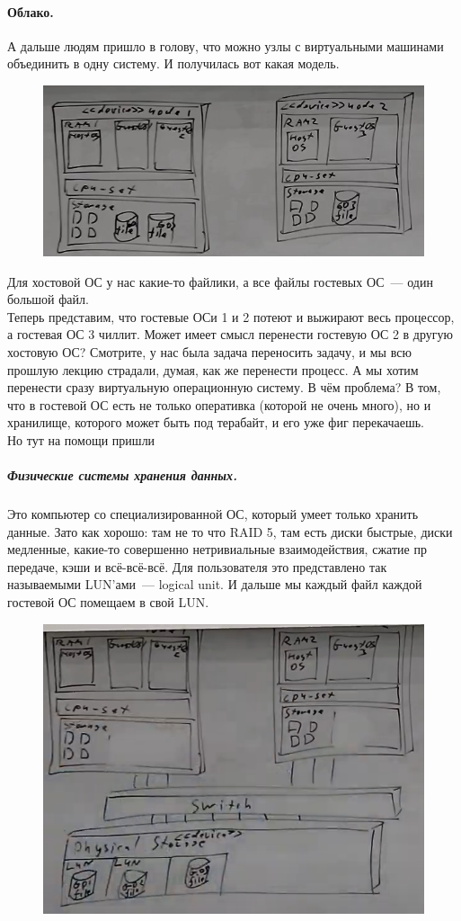 \documentclass{article}
\begin{document}
    \paragraph{Облако.}
    А дальше людям пришло в голову, что можно узлы с виртуальными машинами объединить в одну систему. И получилась вот какая модель.
    \begin{figure}[H]
        \centering
        \includegraphics[width=0.7\linewidth]{Images/screenshot004}
    \end{figure}\noindent
    Для хостовой ОС у нас какие-то файлики, а все файлы гостевых ОС~--- один большой файл.\\
    Теперь представим, что гостевые ОСи 1 и 2 потеют и выжирают весь процессор, а гостевая ОС 3 чиллит. Может имеет смысл перенести гостевую ОС 2 в другую хостовую ОС? Смотрите, у нас была задача переносить задачу, и мы всю прошлую лекцию страдали, думая, как же перенести процесс. А мы хотим перенести сразу виртуальную операционную систему. В чём проблема? В том, что в гостевой ОС есть не только оперативка (которой не очень много), но и хранилище, которого может быть под терабайт, и его уже фиг перекачаешь.\\
    Но тут на помощи пришли
    \subparagraph{Физические системы хранения данных.}
    Это компьютер со специализированной ОС, который умеет только хранить данные. Зато как хорошо: там не то что RAID 5, там есть диски быстрые, диски медленные, какие-то совершенно нетривиальные взаимодействия, сжатие пр передаче, кэши и всё-всё-всё. Для пользователя это представлено так называемыми LUN'ами~--- logical unit. И дальше мы каждый файл каждой гостевой ОС помещаем в свой LUN.
    \begin{figure}[H]
        \centering
        \includegraphics[width=0.7\linewidth]{Images/screenshot005}
    \end{figure}\noindent
\end{document}
